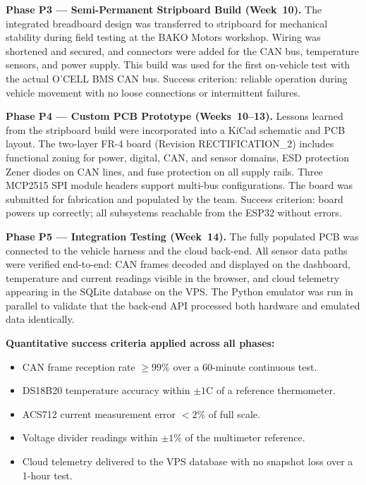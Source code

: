 \textbf{Phase P3 --- Semi-Permanent Stripboard Build (Week~10).}
The integrated breadboard design was transferred to stripboard for mechanical stability during field testing at the BAKO Motors workshop. Wiring was shortened and secured, and connectors were added for the CAN bus, temperature sensors, and power supply. This build was used for the first on-vehicle test with the actual O'CELL BMS CAN bus. Success criterion: reliable operation during vehicle movement with no loose connections or intermittent failures.

\textbf{Phase P4 --- Custom PCB Prototype (Weeks~10--13).}
Lessons learned from the stripboard build were incorporated into a KiCad schematic and PCB layout. The two-layer FR-4 board (Revision RECTIFICATION\_2) includes functional zoning for power, digital, CAN, and sensor domains, ESD protection Zener diodes on CAN lines, and fuse protection on all supply rails. Three MCP2515 SPI module headers support multi-bus configurations. The board was submitted for fabrication and populated by the team. Success criterion: board powers up correctly; all subsystems reachable from the ESP32 without errors.

\textbf{Phase P5 --- Integration Testing (Week~14).}
The fully populated PCB was connected to the vehicle harness and the cloud back-end. All sensor data paths were verified end-to-end: CAN frames decoded and displayed on the dashboard, temperature and current readings visible in the browser, and cloud telemetry appearing in the SQLite database on the VPS. The Python emulator was run in parallel to validate that the back-end API processed both hardware and emulated data identically.

\medskip
\begin{samepage}
\noindent\textbf{Quantitative success criteria applied across all phases:}
\begin{itemize}
    \item CAN frame reception rate $\geq 99\%$ over a 60-minute continuous test.
    \item DS18B20 temperature accuracy within $\pm 1$\textdegree{}C of a reference thermometer.
    \item ACS712 current measurement error $< 2\%$ of full scale.
    \item Voltage divider readings within $\pm 1\%$ of the multimeter reference.
    \item Cloud telemetry delivered to the VPS database with no snapshot loss over a 1-hour test.
\end{itemize}
\end{samepage}
